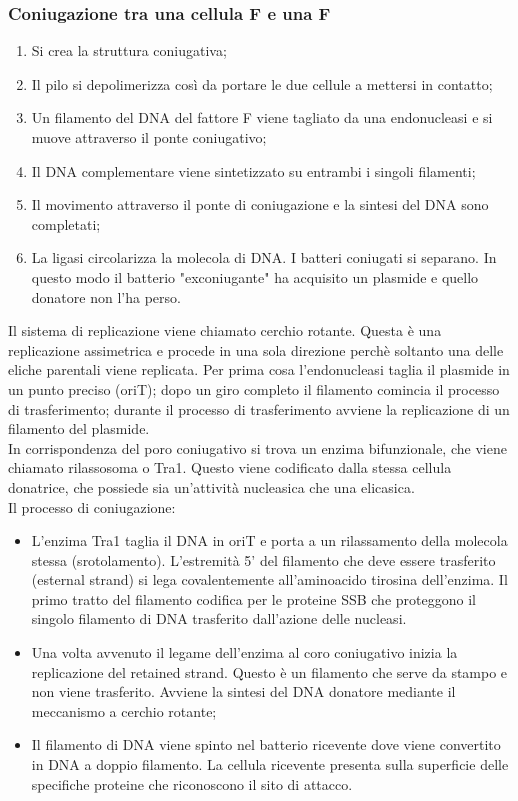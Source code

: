 \subsubsection{Coniugazione tra una cellula F\ap{+} e una F\ap{-}}
\begin{enumerate}
    \item Si crea la struttura coniugativa; 
    \item Il pilo si depolimerizza così da portare le due cellule a mettersi in contatto;
    \item Un filamento del DNA del fattore F viene tagliato da una endonucleasi e si muove attraverso il ponte coniugativo;
    \item Il DNA complementare viene sintetizzato su entrambi i singoli filamenti;
    \item Il movimento attraverso il ponte di coniugazione e la sintesi del DNA sono completati;
    \item La ligasi circolarizza la molecola di DNA. I batteri coniugati si separano. In questo modo il batterio "exconiugante" ha acquisito un plasmide e quello donatore non l'ha perso.
\end{enumerate}
Il sistema di replicazione viene chiamato cerchio rotante. Questa è una replicazione assimetrica e procede in una sola direzione perchè soltanto una delle eliche parentali viene replicata. Per prima cosa l'endonucleasi taglia il plasmide in un punto preciso (oriT); dopo un giro completo il filamento comincia il processo di trasferimento; durante il processo di trasferimento avviene la replicazione di un filamento del plasmide.
\\In corrispondenza del poro coniugativo si trova un enzima bifunzionale, che viene chiamato rilassosoma o Tra1. Questo viene codificato dalla stessa cellula donatrice, che possiede sia un'attività nucleasica che una elicasica. \\Il processo di coniugazione:
\begin{itemize}
    \item L'enzima Tra1 taglia il DNA in oriT e porta a un rilassamento della molecola stessa (srotolamento). L'estremità 5' del filamento che deve essere trasferito (esternal strand) si lega covalentemente all'aminoacido tirosina dell'enzima. Il primo tratto del filamento codifica per le proteine SSB che proteggono il singolo filamento di DNA trasferito dall'azione delle nucleasi. 
    \item Una volta avvenuto il legame dell'enzima al coro coniugativo inizia la replicazione del retained strand. Questo è un filamento che serve da stampo e non viene trasferito. Avviene la sintesi del DNA donatore mediante il meccanismo a cerchio rotante; 
    \item Il filamento di DNA viene spinto nel batterio ricevente dove viene convertito in DNA a doppio filamento. La cellula ricevente presenta sulla
    superficie delle specifiche proteine che riconoscono il sito di attacco. 
\end{itemize}
